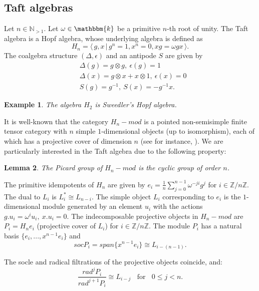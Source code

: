 \documentclass{amsart}
\theoremstyle{plain}%
\newtheorem{lemma}{Lemma}[subsection]
\newtheorem{example}[lemma]{Example}
\theoremstyle{remark}
\newcommand{\1}{\mathbbm{1}}
\newcommand{\N}{\mathbb{N}}
\newcommand{\Z}{\mathbb{Z}}
\newcommand{\kk}{\mathbbm{k}}
\begin{document}
    \subsection{Taft algebras}\label{ssec:gen_Taft_alg}
        Let $ n\in \N_{>1}$.
        Let $\omega \in \kk$ be a primitive $n$-th root of unity. The Taft algebra is a Hopf algebra, whose underlying algebra is defined as $$H_{n}=\langle\, g,x\,|\,g^n=1, x^n=0, xg=\omega gx\,\rangle.$$
        The coalgebra structure $(\Delta, \epsilon)$ and an antipode $S$ are given by
        \begin{align*}
            & \Delta(g) = g\otimes g,~\epsilon(g) = 1\\
            & \Delta(x) = g \otimes x + x\otimes 1,~\epsilon(x) = 0 \\
            & S(g) = g^{-1},~S(x) = -g^{-1}x.
        \end{align*}
    
     
        \begin{example}
            The algebra $H_{2}$ is Sweedler's Hopf algebra.
        \end{example} 

     
        It is well-known that the category $H_n-mod$ is a pointed non-semisimple finite tensor category with $n$ simple $1$-dimensional objects (up to isomorphism), each of which has a projective cover of dimension $n$ (see for instance, \cite{T1, EO}). We are particularly interested in the Taft algebra due to the following property:
        \begin{lemma}
            The Picard group of $H_n-mod$ is the cyclic group of order $n$.
        \end{lemma}
        

        The primitive idempotents of $H_{n}$ are given by $e_i = \frac{1}{n}\sum_{j=0}^{n-1}\omega^{-ji}g^j$ for $i\in \Z/n\Z$. The dual to $L_i$ is $L_i^*\cong L_{n-i}$. The simple object $L_i$ corresponding to $e_i$ is the $1$-dimensional module generated by an element $u_i$ with the actions $g. u_i = \omega^i u_i,~x. u_i = 0$. The indecomposable projective objects in $H_n-mod$ are $P_i =H_{n} e_i$ (projective cover of $L_i$) for $i\in \Z/n\Z$. The module $P_i$ has a natural basis $ \{e_i,...,x^{n-1}e_i\}$ and $$socP_i=span\{x^{n-1}e_i\} \cong L_{i-(n-1)}.$$ 
        
        The socle and radical filtrations of the projective objects coincide, and: 
        $$\frac{rad^j P_i}{rad^{j+1} P_i} \cong L_{i-j} \;\; \text{ for } \;\; 0\leq j< n.$$
\end{document}

